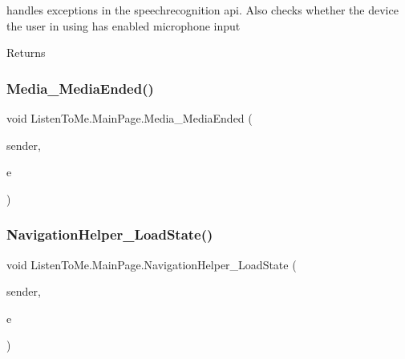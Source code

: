 handles exceptions in the speechrecognition api. Also checks whether the device the user in using has enabled microphone input 

\begin{DoxyReturn}{Returns}

\end{DoxyReturn}
\mbox{\label{class_listen_to_me_1_1_main_page_ab7c9aeb7a6b1053375754c58933360d6}} 
\subsubsection{\texorpdfstring{Media\+\_\+\+Media\+Ended()}{Media\_MediaEnded()}}
{\footnotesize\ttfamily void Listen\+To\+Me.\+Main\+Page.\+Media\+\_\+\+Media\+Ended (\begin{DoxyParamCaption}\item[{object}]{sender,  }\item[{Routed\+Event\+Args}]{e }\end{DoxyParamCaption})\hspace{0.3cm}{\ttfamily [private]}}

\mbox{\label{class_listen_to_me_1_1_main_page_a5d938633b84211b5962e83e1a0077e51}} 
\subsubsection{\texorpdfstring{Navigation\+Helper\+\_\+\+Load\+State()}{NavigationHelper\_LoadState()}}
{\footnotesize\ttfamily void Listen\+To\+Me.\+Main\+Page.\+Navigation\+Helper\+\_\+\+Load\+State (\begin{DoxyParamCaption}\item[{object}]{sender,  }\item[{Load\+State\+Event\+Args}]{e }\end{DoxyParamCaption})\hspace{0.3cm}{\ttfamily [private]}}



